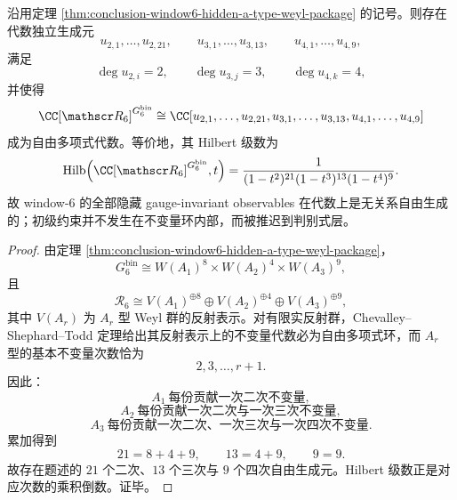 \begin{theorem}[隐藏反射包不变量代数的自由多项式结构]\label{thm:conclusion-window6-hidden-reflection-invariant-polynomial-ring}
沿用定理 \ref{thm:conclusion-window6-hidden-a-type-weyl-package} 的记号。则存在代数独立生成元
\[
u_{2,1},\dots,u_{2,21},\qquad
u_{3,1},\dots,u_{3,13},\qquad
u_{4,1},\dots,u_{4,9},
\]
满足
\[
\deg u_{2,i}=2,\qquad
\deg u_{3,j}=3,\qquad
\deg u_{4,k}=4,
\]
并使得
\[
\CC[\mathscr R_6]^{G_6^{\mathrm{bin}}}
\cong
\CC[u_{2,1},\dots,u_{2,21},u_{3,1},\dots,u_{3,13},u_{4,1},\dots,u_{4,9}]
\]
成为自由多项式代数。等价地，其 Hilbert 级数为
\[
\mathrm{Hilb}\!\left(\CC[\mathscr R_6]^{G_6^{\mathrm{bin}}},t\right)
=
\frac{1}{(1-t^2)^{21}(1-t^3)^{13}(1-t^4)^9}.
\]
故 window-\(6\) 的全部隐藏 gauge-invariant observables 在代数上是无关系自由生成的；初级约束并不发生在不变量环内部，而被推迟到判别式层。
\end{theorem}
\begin{proof}
由定理 \ref{thm:conclusion-window6-hidden-a-type-weyl-package}，
\[
G_6^{\mathrm{bin}}
\cong
W(A_1)^{8}\times W(A_2)^{4}\times W(A_3)^{9},
\]
且
\[
\mathscr R_6
\cong
V(A_1)^{\oplus 8}\oplus V(A_2)^{\oplus 4}\oplus V(A_3)^{\oplus 9},
\]
其中 \(V(A_r)\) 为 \(A_r\) 型 Weyl 群的反射表示。对有限实反射群，Chevalley--Shephard--Todd 定理给出其反射表示上的不变量代数必为自由多项式环，而 \(A_r\) 型的基本不变量次数恰为
\[
2,3,\dots,r+1.
\]
因此：
\[
A_1\ \text{每份贡献一次二次不变量},
\]
\[
A_2\ \text{每份贡献一次二次与一次三次不变量},
\]
\[
A_3\ \text{每份贡献一次二次、一次三次与一次四次不变量}.
\]
累加得到
\[
21=8+4+9,\qquad
13=4+9,\qquad
9=9.
\]
故存在题述的 \(21\) 个二次、\(13\) 个三次与 \(9\) 个四次自由生成元。Hilbert 级数正是对应次数的乘积倒数。证毕。
\end{proof}

